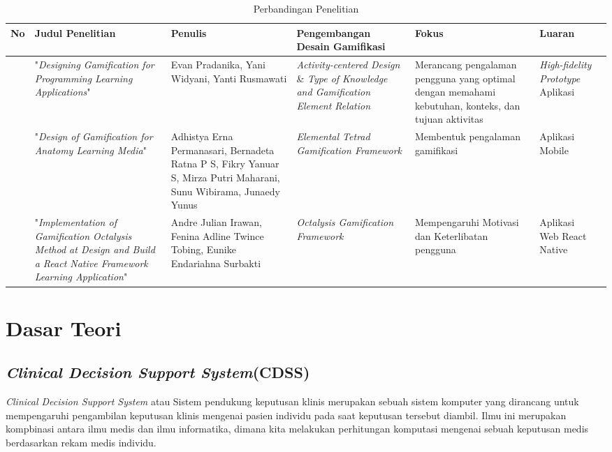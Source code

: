 \newpage
\begin{landscape}
	\begin{table}[htbp]
	\caption{Perbandingan Penelitian}
	\centering
	\begin{tabular}{|>{\centering\arraybackslash}m{0.5cm}|m{4cm}|m{3.5cm}|m{4.5cm}|m{4.5cm}|m{4cm}|m{4cm}|}
		\hline
		\centering \textbf{No} & \centering \textbf{Judul Penelitian} & \centering \textbf{Penulis} & \centering  \textbf{Pengembangan Desain Gamifikasi} &\centering\textbf{Fokus}&\multicolumn{1}{m{4cm}|}{\centering\textbf{Luaran}} \\
		\hline 
		1 & "\textit{Designing Gamification for Programming Learning Applications}"
		& 
		Evan Pradanika, Yani Widyani,  Yanti Rusmawati
		& \textit{Activity-centered Design} \& \textit{Type of Knowledge and Gamification Element Relation}& Merancang pengalaman pengguna yang optimal dengan memahami kebutuhan, konteks, dan tujuan aktivitas& \textit{High-fidelity Prototype} Aplikasi\\
		\hline
		2 &"\textit{Design of Gamification for Anatomy Learning Media}" 
		& 
		Adhistya Erna Permanasari, Bernadeta Ratna P S, Fikry Yanuar S, Mirza Putri Maharani, Sunu Wibirama, Junaedy Yunus
		& \textit{Elemental Tetrad Gamification Framework} & Membentuk pengalaman gamifikasi & Aplikasi Mobile\\
		\hline
		3 & 
		"\textit{Implementation of Gamification Octalysis Method at Design and Build a React Native Framework Learning Application}" 
		& 
		Andre Julian Irawan, Fenina Adline Twince Tobing, Eunike Endariahna Surbakti
		& \textit{Octalysis Gamification Framework}& Mempengaruhi Motivasi dan Keterlibatan pengguna & Aplikasi Web React Native\\
		\hline
	  \end{tabular}
	  \label{Tab: Tabel perbandingan metode}
	\end{table}
\end{landscape}

\newpage
\section{Dasar Teori}
\subsection{\textit{Clinical Decision Support System}(CDSS)}
\textit{Clinical Decision Support System} atau Sistem pendukung keputusan klinis merupakan sebuah sistem komputer yang dirancang untuk mempengaruhi pengambilan keputusan klinis mengenai pasien individu pada saat keputusan tersebut diambil\cite{sutton2020overview}.
Ilmu ini merupakan kompbinasi antara ilmu medis dan ilmu informatika, dimana kita melakukan perhitungan komputasi mengenai sebuah keputusan medis berdasarkan rekam medis individu.
